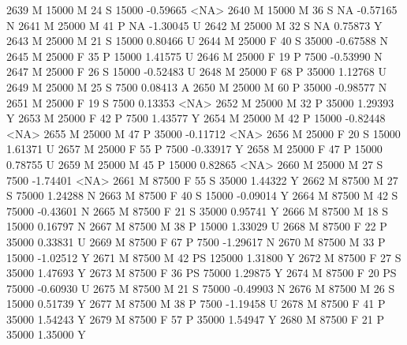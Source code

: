 \documentclass{article}
\begin{document}
\begin{Schunk}
\begin{Soutput}
2639      M      15000   M  24         S  15000  -0.59665 <NA>
2640      M      15000   M  36         S     NA  -0.57165    N
2641      M      25000   M  41         P     NA  -1.30045    U
2642      M      25000   M  32         S     NA   0.75873    Y
2643      M      25000   M  21         S  15000   0.80466    U
2644      M      25000   F  40         S  35000  -0.67588    N
2645      M      25000   F  35         P  15000   1.41575    U
2646      M      25000   F  19         P   7500  -0.53990    N
2647      M      25000   F  26         S  15000  -0.52483    U
2648      M      25000   F  68         P  35000   1.12768    U
2649      M      25000   M  25         S   7500   0.08413    A
2650      M      25000   M  60         P  35000  -0.98577    N
2651      M      25000   F  19         S   7500   0.13353 <NA>
2652      M      25000   M  32         P  35000   1.29393    Y
2653      M      25000   F  42         P   7500   1.43577    Y
2654      M      25000   M  42         P  15000  -0.82448 <NA>
2655      M      25000   M  47         P  35000  -0.11712 <NA>
2656      M      25000   F  20         S  15000   1.61371    U
2657      M      25000   F  55         P   7500  -0.33917    Y
2658      M      25000   F  47         P  15000   0.78755    U
2659      M      25000   M  45         P  15000   0.82865 <NA>
2660      M      25000   M  27         S   7500  -1.74401 <NA>
2661      M      87500   F  55         S  35000   1.44322    Y
2662      M      87500   M  27         S  75000   1.24288    N
2663      M      87500   F  40         S  15000  -0.09014    Y
2664      M      87500   M  42         S  75000  -0.43601    N
2665      M      87500   F  21         S  35000   0.95741    Y
2666      M      87500   M  18         S  15000   0.16797    N
2667      M      87500   M  38         P  15000   1.33029    U
2668      M      87500   F  22         P  35000   0.33831    U
2669      M      87500   F  67         P   7500  -1.29617    N
2670      M      87500   M  33         P  15000  -1.02512    Y
2671      M      87500   M  42        PS 125000   1.31800    Y
2672      M      87500   F  27         S  35000   1.47693    Y
2673      M      87500   F  36        PS  75000   1.29875    Y
2674      M      87500   F  20        PS  75000  -0.60930    U
2675      M      87500   M  21         S  75000  -0.49903    N
2676      M      87500   M  26         S  15000   0.51739    Y
2677      M      87500   M  38         P   7500  -1.19458    U
2678      M      87500   F  41         P  35000   1.54243    Y
2679      M      87500   F  57         P  35000   1.54947    Y
2680      M      87500   F  21         P  35000   1.35000    Y

\end{Soutput}
\end{Schunk}
\end{document}

